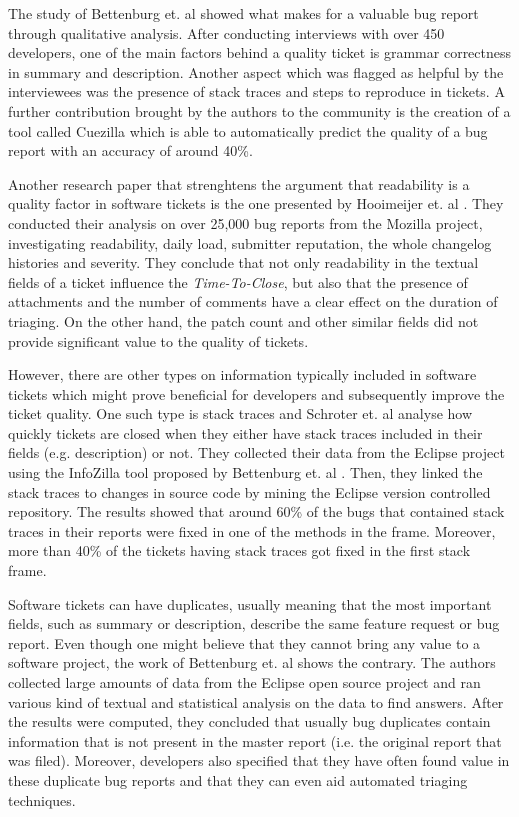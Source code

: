 \documentclass{mpaper}
\begin{document}
The study of Bettenburg et. al \cite{bettenburg2008makes} showed what 
makes for a valuable bug report through qualitative analysis. 
After conducting interviews with over 450 developers, one of the main factors
behind a quality ticket is grammar correctness in summary and description. Another
aspect which was flagged as helpful by the interviewees was the presence of stack 
traces and steps to reproduce in tickets. A further contribution brought by the
authors to the community is the creation of a tool called Cuezilla which is able 
to automatically predict the quality of a bug report with an accuracy of around 40\%.

Another research paper that strenghtens the argument that readability is a quality 
factor in software tickets is the one presented by Hooimeijer et. al \cite{hooimeijer2007modeling}.
They conducted their analysis on over 25,000 bug reports from the Mozilla project, 
investigating readability, daily load, submitter reputation, the whole changelog histories 
and severity. They conclude that not only readability in the textual fields of a ticket
influence the \emph{Time-To-Close}, but also that the presence of attachments and 
the number of comments have a clear effect on the duration of triaging. On the 
other hand, the patch count and other similar fields did not provide significant 
value to the quality of tickets.

However, there are other types on information typically included in software tickets 
which might prove beneficial for developers and subsequently improve the ticket quality.
One such type is stack traces and Schroter et. al \cite{schroter2010stack} analyse how 
quickly tickets are closed when they either have stack traces included in their fields 
(e.g. description) or not. They collected their data from the Eclipse project using 
the InfoZilla tool proposed by Bettenburg et. al \cite{bettenburg2008extracting}.
Then, they linked the stack traces to changes in source code by mining the Eclipse version 
controlled repository. The results showed that 
around 60\% of the bugs that contained stack traces in their reports were fixed
in one of the methods in the frame. Moreover, more than 40\% of the tickets having stack traces
got fixed in the first stack frame.

Software tickets can have duplicates, usually meaning that the most important fields, such 
as summary or description, describe the same feature request or bug report. Even though 
one might believe that they cannot bring any value to a software project, the work of 
Bettenburg et. al \cite{bettenburg2008duplicate} shows the contrary.
The authors collected large amounts of data from the Eclipse open source project and ran
various kind of textual and statistical analysis on the data to find answers.
After the results were computed, they concluded that usually bug duplicates contain 
information that is not present in the master report (i.e. the original report that was 
filed). Moreover, developers also specified that they have often found value in these 
duplicate bug reports and that they can even aid automated triaging techniques.
\end{document}
